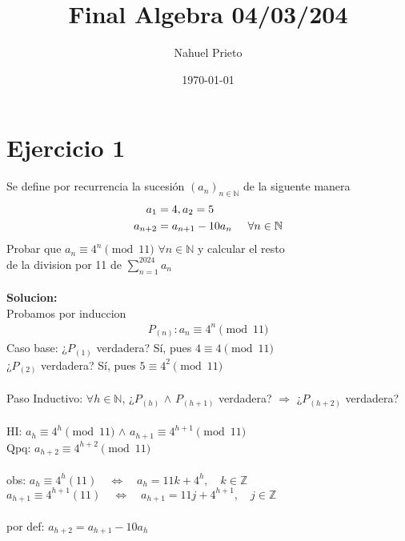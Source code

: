 \documentclass[a4paper]{article}
\title{Final Algebra 04/03/204}
\author{Nahuel Prieto}
\date{\today}
\begin{document}
\maketitle

\section{Ejercicio 1}
    Se define por recurrencia la sucesión $(a_{n})_{n \in \mathbb{N}}$ de la siguente manera 
\begin{align*}
    a_1 &= 4,  a_2 = 5 \\ a_{n+2} &= a_{n+1} - 10a_n \hspace{0.5cm} \forall n \in \mathbb{N}
\end{align*}
Probar que $a_n\equiv 4^n \pmod{11}$ $\forall n \in \mathbb{N}$ y calcular el resto \\
de la division por 11 de $\sum_{n=1}^{2024} a_n$\\ \\
\textbf{Solucion:} \\
Probamos por induccion
\begin{align*}
    P_{(n)}: a_n \equiv 4^n \pmod{11}
\end{align*}
Caso base: ¿$P_{(1)}$ verdadera? Sí, pues $4 \equiv 4 \pmod{11}$\\
\hspace*{50px}¿$P_{(2)}$ verdadera? Sí, pues $5 \equiv 4^2 \pmod{11}$ \\ \\
Paso Inductivo: $\forall h \in \mathbb{N}$, ¿$P_{(h)}$ $\land$ $P_{(h+1)}$ verdadera? $\Rightarrow$ ¿$P_{(h+2)}$ verdadera? \\ \\
HI: $a_h \equiv 4^h \pmod{11}$ $\land$ $a_{h+1} \equiv 4^{h+1} \pmod{11}$ \\
Qpq: $a_{h+2} \equiv 4^{h+2} \pmod{11}$ \\ \\
obs: $a_h \equiv 4^h (11) \quad \Longleftrightarrow \quad a_h = 11k +4^h, \quad k \in \mathbb{Z}$  \\
\hspace*{0.4cm}$a_{h+1} \equiv 4^{h+1} (11) \quad \Longleftrightarrow \quad a_{h+1} = 11j +4^{h+1}, \quad j \in \mathbb{Z}$ \\ \\
por def: $a_{h+2} = a_{h+1} - 10a_h$     
\end{document}
